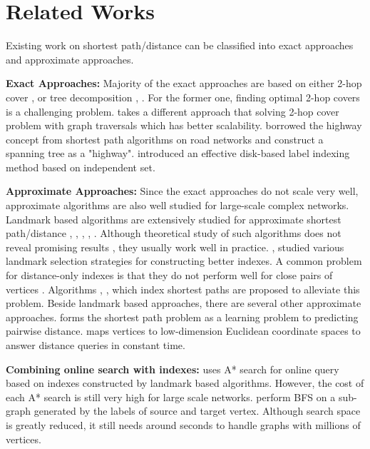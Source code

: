 \section{Related Works}
\label{relatedwork}

Existing work on shortest path/distance can be classified into exact approaches and approximate approaches. 

\textbf{Exact Approaches:} Majority of the exact approaches are based on either 2-hop cover \cite{Cohen:2002:RDQ:545381.545503}, \cite{Akiba:2013:FES:2463676.2465315} or tree decomposition \cite{Akiba:2012:SQC:2247596.2247614}, \cite{Wei:2010:TES:1807167.1807181}. For the former one, finding optimal 2-hop covers is a challenging problem. \cite{Akiba:2013:FES:2463676.2465315} takes a different approach that solving 2-hop cover problem with graph traversals which has better scalability. \cite{Jin:2012:HLA:2213836.2213887} borrowed the highway concept from shortest path algorithms on road networks and construct a spanning tree as a "highway". \cite{Fu:2013:IIB:2536336.2536346} introduced an effective disk-based label indexing method based on independent set.

\textbf{Approximate Approaches:} Since the exact approaches do not scale very well, approximate algorithms are also well studied for large-scale complex networks. Landmark based algorithms are extensively studied for approximate shortest path/distance \cite{Thorup:2005:ADO:1044731.1044732}, \cite{Goldberg:2005:CSP:1070432.1070455}, \cite{Potamias:2009:FSP:1645953.1646063}, \cite{floreskul2014memory}, \cite{Maier:2011:INS:1993077.1993079}. Although theoretical study of such algorithms does not reveal promising results \cite{Thorup:2005:ADO:1044731.1044732}, they usually work well in practice. \cite{Potamias:2009:FSP:1645953.1646063}, \cite{6927522} studied various landmark selection strategies for constructing better indexes. A common problem for distance-only indexes is that they do not perform well for close pairs of vertices \cite{Akiba:2012:SQC:2247596.2247614}. Algorithms \cite{Gubichev:2010:FAE:1871437.1871503}, \cite{tretyakov2011fast}, \cite{6399472} which index shortest paths are proposed to alleviate this problem. Beside landmark based approaches, there are several other approximate approaches. \cite{7004250} forms the shortest path problem as a learning problem to predicting pairwise distance. \cite{Zhao:2010:OSP:1863190.1863199} maps vertices to low-dimension Euclidean coordinate spaces to answer distance queries in constant time.

\textbf{Combining online search with indexes:}
\cite{Goldberg:2005:CSP:1070432.1070455} uses A* search for online query based on indexes constructed by landmark based algorithms. However, the cost of each A* search is still very high for large scale networks. \cite{Gubichev:2010:FAE:1871437.1871503} perform BFS on a sub-graph generated by the labels of source and target vertex. Although search space is greatly reduced, it still needs around seconds to handle graphs with millions of vertices.
